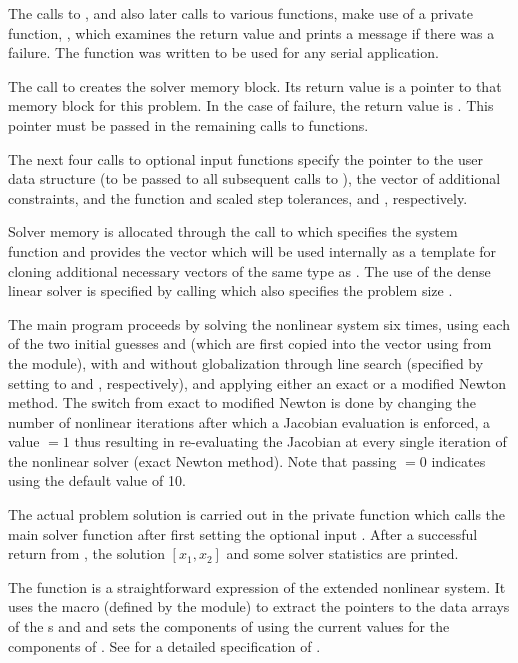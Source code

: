 The calls to , and also later calls to various 
functions, make use of a private function, , which examines
the return value and prints a message if there was a failure.  The
 function was written to be used for any serial {\sundials}
application.

The call to  creates the {\kinsol} solver memory block.
Its return value is a pointer to that memory block for this
problem.  In the case of failure, the return value is .  This
pointer must be passed in the remaining calls to {\kinsol} functions.

The next four calls to {\kinsol} optional input functions specify the 
pointer to the user data structure (to be passed to all subsequent calls
to ), the vector of additional constraints, and the function and
scaled step tolerances,  and , respectively.

Solver memory is allocated through the call to  which
specifies the system function  and provides the vector 
which will be used internally as a template for cloning additional necessary
vectors of the same type as . 
The use of the dense linear solver is specified by calling  which
also specifies the problem size .

The main program proceeds by solving the nonlinear system six times, using 
each of the two initial guesses  and  (which are first copied
into the vector  using  from
the {\nvecs} module), with and without globalization through line search
(specified by setting  to  and ,
respectively), and applying either an exact or a modified Newton method.
The switch from exact to modified Newton is done by changing the number of 
nonlinear iterations after which a Jacobian evaluation is enforced, a value
$=1$ thus resulting in re-evaluating the Jacobian at every single
iteration of the nonlinear solver (exact Newton method). Note that passing
$=0$ indicates using the default {\kinsol} value of 10.

The actual problem solution is carried out in the private function 
which calls the main solver function  after first setting the optional
input . After a successful return from , the solution
$[x_1, x_2]$ and some solver statistics are printed. 

The function  is a straightforward expression of the extended nonlinear 
system. It uses the macro  (defined by the {\nvecs} module)
to extract the pointers to the data arrays of the s  and 
and sets the components of  using the current values for the components
of .
See  for a detailed specification of .


